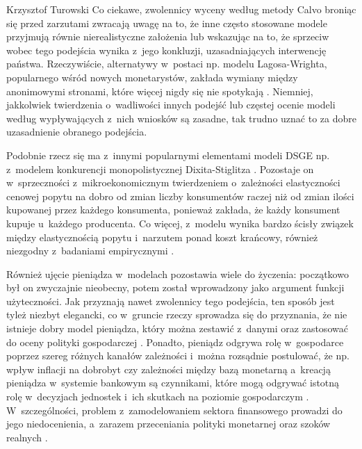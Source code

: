 \begin{artplenv}{Krzysztof Turowski}
Co ciekawe, zwolennicy wyceny według metody Calvo broniąc się przed zarzutami zwracają uwagę na to, że inne często
stosowane modele przyjmują równie nierealistyczne założenia lub wskazując na to, że sprzeciw wobec tego podejścia
wynika z~jego konkluzji, uzasadniających interwencję państwa. Rzeczywiście, alternatywy w~postaci np. modelu
Lagosa-Wrighta, popularnego wśród nowych monetarystów, zakłada wymiany między anonimowymi stronami, które więcej nigdy
się nie spotykają
\parencite{lagos_unified_2005}.
Niemniej, jakkolwiek twierdzenia o~wadliwości innych
podejść lub częstej ocenie modeli według wypływających z~nich wniosków są zasadne, tak trudno uznać to za dobre
uzasadnienie obranego podejścia.

Podobnie rzecz się ma z~innymi popularnymi elementami modeli DSGE np. z~modelem konkurencji monopolistycznej
Dixita-Stiglitza
\parencite{blanchard_monopolistic_1987}.
Pozostaje on w~sprzeczności z~mikroekonomicznym
twierdzeniem o~zależności elastyczności cenowej popytu na dobro od zmian liczby konsumentów raczej niż od zmian ilości
kupowanej przez każdego konsumenta, ponieważ zakłada, że każdy konsument kupuje u~każdego producenta. Co
więcej, z~modelu wynika bardzo ścisły związek między elastycznością popytu i~narzutem ponad koszt krańcowy, również
niezgodny z~badaniami empirycznymi
\parencite{yun_reconsidering_2011}.

Również ujęcie pieniądza w~modelach pozostawia wiele do życzenia: początkowo był on zwyczajnie nieobecny, potem został
wprowadzony jako argument funkcji użyteczności. Jak przyznają nawet zwolennicy tego podejścia, ten sposób jest tyleż
niezbyt elegancki, co w~gruncie rzeczy sprowadza się do przyznania, że nie istnieje dobry model pieniądza, który można
zestawić z~danymi oraz zastosować do oceny polityki gospodarczej
\parencite{fernandez-villaverde_econometrics_2010}.
Ponadto, pieniądz odgrywa rolę w~gospodarce poprzez szereg różnych kanałów zależności i~można rozsądnie postulować, że
np. wpływ inflacji na dobrobyt czy zależności między bazą monetarną a~kreacją pieniądza w~systemie bankowym są
czynnikami, które mogą odgrywać istotną rolę w~decyzjach jednostek i~ich skutkach na poziomie gospodarczym
\parencite{wallace_whither_2001}.
W~szczególności, problem z~zamodelowaniem sektora finansowego prowadzi do
jego niedocenienia, a~zarazem przeceniania polityki monetarnej oraz szoków realnych
\parencite{tovar_dsge_2009}.


\end{artplenv}

